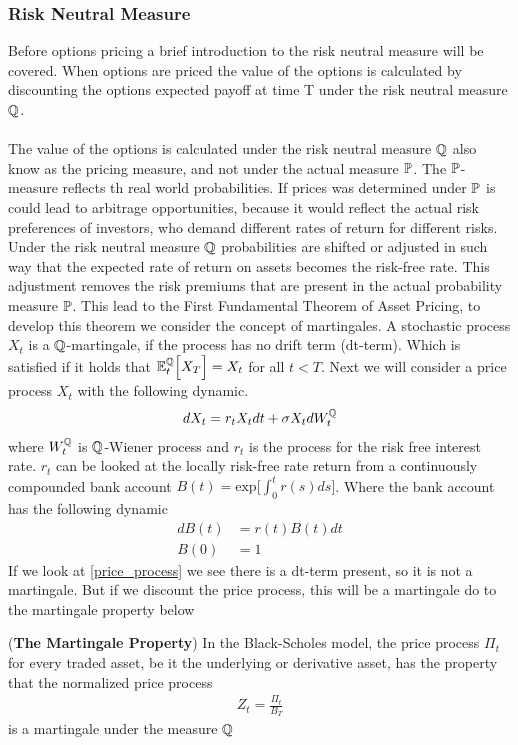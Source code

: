 \subsubsection{Risk Neutral Measure} \label{risk_neutral_section}
Before options pricing a brief introduction to the risk neutral measure will be covered.
When options are priced the value of the options is calculated by discounting 
the options expected payoff at time T under the risk neutral measure $\mathbb{Q}$. 
\\\\
The value of the options is calculated under the risk neutral measure $\mathbb{Q}$ also know as the pricing measure, and 
not under the actual measure $\mathbb{P}$. The $\mathbb{P}$- measure reflects th real world probabilities. If prices was determined 
under $\mathbb{P}$ is could lead to arbitrage opportunities, because it would reflect the actual risk preferences of
investors, who demand different rates of return for different risks. Under the risk neutral measure $\mathbb{Q}$  
probabilities are shifted or adjusted in such way that the expected rate of return on assets becomes the risk-free rate. 
This adjustment removes the risk premiums that are present in the actual probability measure $\mathbb{P}$.
This lead to the First Fundamental Theorem of Asset Pricing, to develop this theorem we consider 
the concept of martingales. 
A stochastic process $X_t$ is a $\mathbb{Q}$-martingale, if the process has no drift term (dt-term). Which is satisfied if it holds that
$\mathbb{E}_{t}^{\mathbb{Q}}\Big[X_T\Big] = X_t$ for all $t<T$. Next we will consider a price process $X_t$ with the following dynamic.
\begin{align}
    d X_t = r_t X_t dt + \sigma X_t d W_{t}^{\mathbb{Q}}
    \label{price_process}
\end{align}
where $W_{t}^{\mathbb{Q}}$ is $\mathbb{Q}$-Wiener process and  $r_t$ is the process for the risk free interest rate. $r_t$ can be looked at the locally risk-free rate return 
from a continuously compounded bank account $B(t)= \text{exp} \Big[\int_{0}^{t}r(s)ds \Big]$.
Where the bank account has the following dynamic
\begin{align}
    dB(t) &= r(t)B(t) dt \label{bank1}\\
    B(0) & = 1 \label{bank2}
\end{align}
If we look at \autoref{price_process} we see there is a dt-term present, so it is not a martingale.
But if we discount the price process, this will be a martingale do to the martingale property below
\begin{proposition}
    (\textbf{The Martingale Property}) In the Black-Scholes model, the price process $\Pi_t$
    for every traded asset, be it the underlying or derivative asset, has the property that the normalized price process
    \begin{align*}
        Z_t = \frac{\Pi_t}{B_T}
    \end{align*}
    is a martingale under the measure $\mathbb{Q}$ \cite{Bjork}
\end{proposition}
